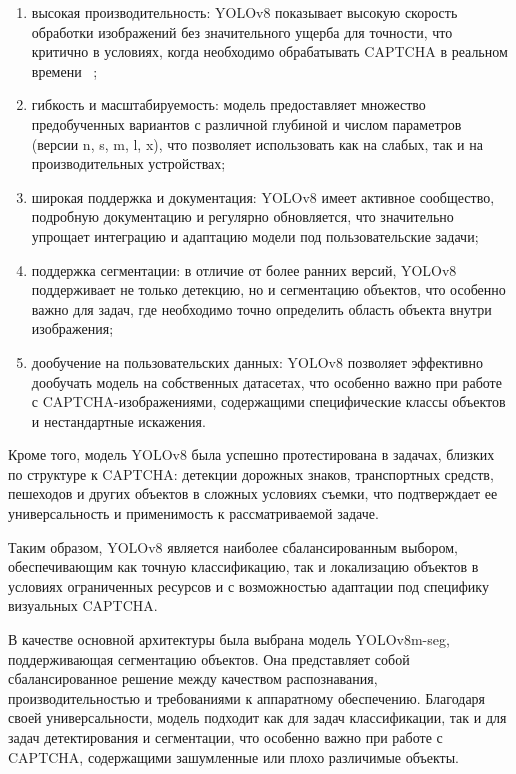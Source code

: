 \begin{enumerate}
    \item высокая производительность: YOLOv8 показывает высокую скорость 
    обработки изображений без значительного ущерба для точности, что критично в 
    условиях, когда необходимо обрабатывать CAPTCHA в реальном времени~
    \cite{bochkovskiy2020yolov4};
    \item гибкость и масштабируемость: модель предоставляет множество 
    предобученных вариантов с различной глубиной и числом параметров (версии n, 
    s, m, l, x), что позволяет использовать как на слабых, так и на 
    производительных устройствах;
    \item широкая поддержка и документация: YOLOv8 имеет активное сообщество, 
    подробную документацию и регулярно обновляется, что значительно упрощает 
    интеграцию и адаптацию модели под пользовательские задачи;
    \item поддержка сегментации: в отличие от более ранних версий, YOLOv8 
    поддерживает не только детекцию, но и сегментацию объектов, что особенно 
    важно для задач, где необходимо точно определить область объекта внутри 
    изображения;
    \item дообучение на пользовательских данных: YOLOv8 позволяет эффективно 
    дообучать модель на собственных датасетах, что особенно важно при работе с 
    CAPTCHA-изображениями, содержащими специфические классы объектов и 
    нестандартные искажения.
\end{enumerate}

Кроме того, модель YOLOv8 была успешно протестирована в задачах, близких по 
структуре к CAPTCHA: детекции дорожных знаков, транспортных средств, пешеходов и 
других объектов в сложных условиях съемки, что подтверждает ее универсальность и 
применимость к рассматриваемой задаче.

Таким образом, YOLOv8 является наиболее сбалансированным выбором, обеспечивающим 
как точную классификацию, так и локализацию объектов в условиях ограниченных 
ресурсов и с возможностью адаптации под специфику визуальных CAPTCHA.

В качестве основной архитектуры была выбрана модель YOLOv8m-seg, поддерживающая 
сегментацию объектов. Она представляет собой сбалансированное решение между 
качеством распознавания, производительностью и требованиями к аппаратному 
обеспечению. Благодаря своей универсальности, модель подходит как для задач 
классификации, так и для задач детектирования и сегментации, что особенно важно 
при работе с CAPTCHA, содержащими зашумленные или плохо различимые объекты.

